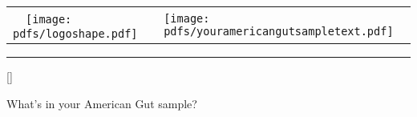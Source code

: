 \documentclass[landscape]{article}
\begin{document}
\begin{tabular}{ m{4.4cm} m{16cm} }  %
	~~\texttt{[image: pdfs/logoshape.pdf]} & \texttt{[image: pdfs/youramericangutsampletext.pdf]} \\
\end{tabular}

\hrule

\vspace{0.65cm}

\begin{center}

\StrLen{\yourname}[\yournameLen]


\end{center}

\vspace{0.65cm}

{\huge What's in your American Gut sample?}

\vspace{2mm}
\end{document}
